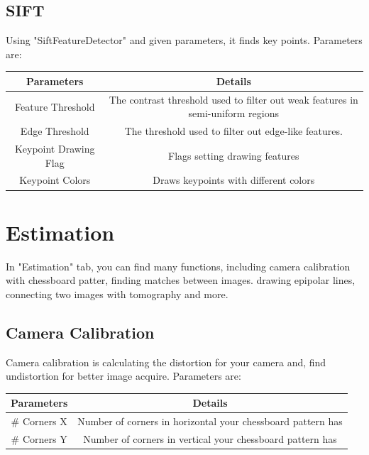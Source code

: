 \documentclass{article}
\begin{document}
	
	\subsection{SIFT}
	Using "SiftFeatureDetector" and given parameters, it finds key points. Parameters are:
	
\begin{table}[H]
\begin{center}
\begin{tabular}{|c|c|l|l|l|}
\hline
\textbf{Parameters}   & \multicolumn{4}{|c|}{\textbf{Details}}                                                                \\ \hline
Feature Threshold     & \multicolumn{4}{|c|}{The contrast threshold used to filter out weak features in semi-uniform regions} \\ \hline
Edge Threshold        & \multicolumn{4}{|c|}{The threshold used to filter out edge-like features.}                            \\ \hline
Keypoint Drawing Flag & \multicolumn{4}{|c|}{Flags setting drawing features}                                                  \\ \hline
Keypoint Colors       & \multicolumn{4}{|c|}{Draws keypoints with different colors}                                           \\ \hline
\end{tabular}
\end{center}
\end{table}

\section{Estimation}
In "Estimation" tab, you can find many functions, including camera calibration with chessboard patter, finding matches between images. drawing epipolar lines, connecting two images with tomography and more.

\subsection{Camera Calibration}
Camera calibration is calculating the distortion for your camera and, find undistortion for better image acquire. Parameters are:

\begin{table}[H]
\begin{center}
\begin{tabular}{|c|c|l|l|l|}
\hline
\textbf{Parameters} & \multicolumn{4}{|c|}{\textbf{Details}}                                            \\ \hline
\# Corners X        & \multicolumn{4}{|c|}{Number of corners in horizontal your chessboard pattern has} \\ \hline
\# Corners Y        & \multicolumn{4}{|c|}{Number of corners in vertical your chessboard pattern has}   \\ \hline
\end{tabular}
\end{center}
\end{table}
\end{document}
